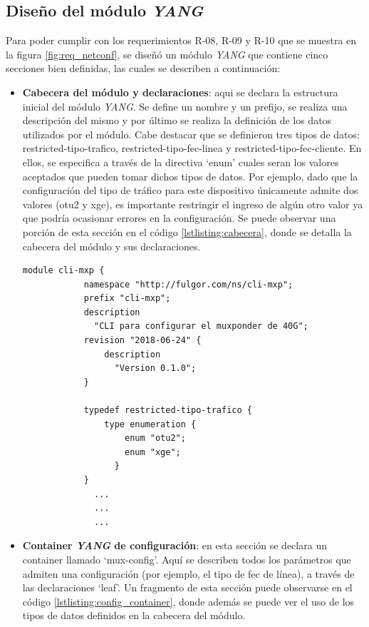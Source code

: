 \subsection{Diseño del módulo \textit{YANG}}

Para poder cumplir con los requerimientos R-08, R-09 y R-10 que se muestra en la figura \ref{fig:req_netconf}, se diseñó un módulo \textit{YANG} que contiene cinco secciones bien definidas, las cuales se describen a continuación: 

\begin{itemize}
	\item \textbf{Cabecera del módulo y declaraciones}: aqui se declara la estructura inicial del módulo \textit{YANG}. Se define un nombre y un prefijo, se realiza una descripción del mismo y por último se realiza la definición de los datos utilizados por el módulo. Cabe destacar que se definieron tres tipos de datos: restricted-tipo-trafico, restricted-tipo-fec-linea y restricted-tipo-fec-cliente. En ellos, se especifica a través de la directiva ‘enum’ cuales seran los valores aceptados que pueden tomar dichos tipos de datos. Por ejemplo, dado que la configuración del tipo de tráfico para este dispositivo únicamente admite dos valores (otu2 y xge), es importante restringir el ingreso de algún otro valor ya que podría ocasionar errores en la configuración. Se puede observar una porción de esta sección en el código \ref{lstlisting:cabecera}, donde se detalla la cabecera del módulo y sus declaraciones.  

  \newpage
    \begin{lstlisting}[language=SHELXL, caption=Cabecera del módulo \textit{YANG}., label=lstlisting:cabecera]
        module cli-mxp {
            namespace "http://fulgor.com/ns/cli-mxp";
            prefix "cli-mxp";
            description
              "CLI para configurar el muxponder de 40G";
            revision "2018-06-24" {
                description
                  "Version 0.1.0";
            }

            typedef restricted-tipo-trafico {
                type enumeration {
                    enum "otu2";
                    enum "xge";
                  }
            }
              ...
              ...
              ...

    \end{lstlisting}

    \item \textbf{Container \textit{YANG} de configuración}: en esta sección se declara un container llamado ‘mux-config’. Aquí se describen todos los parámetros que admiten una configuración (por ejemplo, el tipo de fec de línea), a través de las declaraciones ‘leaf’. Un fragmento de esta sección puede observarse en el código \ref{lstlisting:config_container}, donde además se puede ver el uso de los tipos de datos definidos en la cabecera del módulo.
  

\end{itemize}
